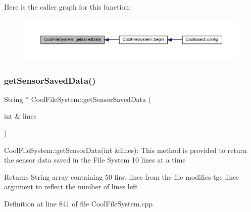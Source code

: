 Here is the caller graph for this function\+:\nopagebreak
\begin{figure}[H]
\begin{center}
\leavevmode
\includegraphics[width=350pt]{db/d0c/class_cool_file_system_a70701d05e811604af1b531f4f6dc69ed_icgraph}
\end{center}
\end{figure}
\mbox{\label{class_cool_file_system_a3223ffff4266a6300988fab956d6b4b2}} 
\subsubsection{\texorpdfstring{get\+Sensor\+Saved\+Data()}{getSensorSavedData()}}
{\footnotesize\ttfamily String $\ast$ Cool\+File\+System\+::get\+Sensor\+Saved\+Data (\begin{DoxyParamCaption}\item[{int \&}]{lines }\end{DoxyParamCaption})}

Cool\+File\+System\+::get\+Sensor\+Data(int \&lines)\+: This method is provided to return the sensor data saved in the File System 10 lines at a time

\begin{DoxyReturn}{Returns}
String array containing 50 first lines from the file modifies tge lines argument to reflect the number of lines left 
\end{DoxyReturn}


Definition at line 841 of file Cool\+File\+System.\+cpp.



